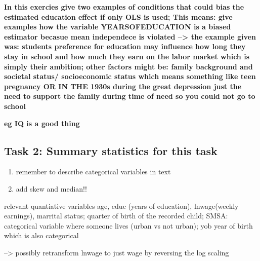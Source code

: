 \documentclass[a4paper]{article}
\begin{document}
\textbf{In this exercies give two examples of conditions that could bias the estimated education effect if only OLS is used; This means: give examples how the variable YEARSOFEDUCATION is a biased estimator becasue mean independece is violated --> the example given was: students preference for education may influence how long they stay in school and how much they earn on the labor market which is simply their ambition; other factors might be: family background and societal status/ socioeconomic status which means something like teen pregnancy OR IN THE 1930s during the great depression just the need to support the family during time of need so you could not go to school}

\textbf{eg IQ is a good thing}


\subsection{Task 2: Summary statistics for this task}

\begin{enumerate}
   \item remember to describe categorical variables in text
   \item add skew and median!!
\end{enumerate}


relevant quantiative variables age, educ (years of education), lnwage(weekly earnings), marrital status; quarter of birth of the recorded child; SMSA: categorical variable where someone lives (urban vs not urban); yob year of birth which is also categorical

--> possibly retransform lnwage to just wage by reversing the log scaling
\end{document}
